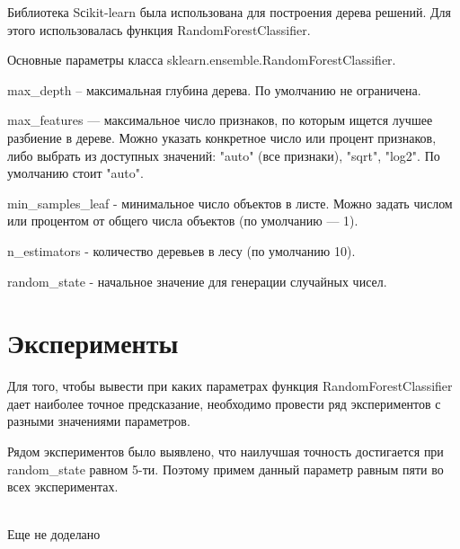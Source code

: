\documentclass[a4paper,12pt]{article}
\begin{document}
	\vspace{0.5cm}
	Библиотека Sсikit-learn была использована для построения дерева решений. Для этого использовалась функция RandomForestClassifier. 
	
	\vspace{0.5cm}
	Основные параметры класса sklearn.ensemble.RandomForestClassifier.
	
	\vspace{0.5cm}
	max\_depth – максимальная глубина дерева. По умолчанию не ограничена.
	
	\vspace{0.5cm}
	max\_features — максимальное число признаков, по которым ищется лучшее разбиение в дереве. Можно указать конкретное число или процент признаков, либо выбрать из доступных значений: "auto" (все признаки), "sqrt", "log2". По умолчанию стоит "auto".
	
	\vspace{0.5cm}
	min\_samples\_leaf - минимальное число объектов в листе. Можно задать числом или процентом от общего числа объектов (по умолчанию — 1).
	
	\vspace{0.5cm}
	n\_estimators - количество деревьев в лесу (по умолчанию 10).
	
	\vspace{0.5cm}
	random\_state - начальное значение для генерации случайных чисел.

	
\newpage\section{Эксперименты}
	Для того, чтобы вывести при каких параметрах функция RandomForestClassifier дает наиболее точное предсказание, необходимо провести ряд экспериментов с разными значениями параметров. 
	
	\vspace{0.5cm}
	Рядом экспериментов было выявлено, что наилучшая точность достигается при random\_state равном 5-ти. Поэтому примем данный параметр равным пяти во всех экспериментах.
	
	\\Еще не доделано
	
\end{document}
